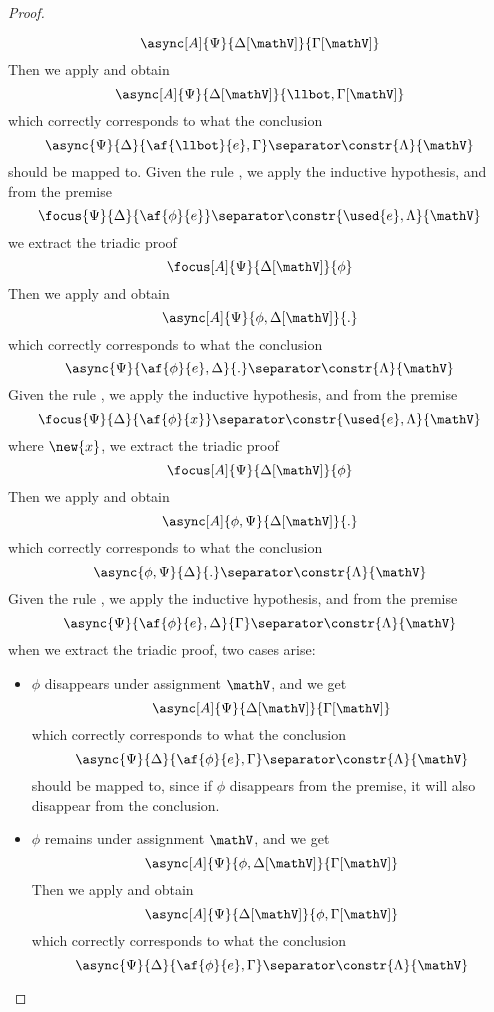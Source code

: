 \begin{proof}
\begin{itemize}
			$$ \async[A]{\Psi}{\Delta[\mathV]}{\Gamma[\mathV]} $$
			Then we apply \derRule[A]{\displaybot} and obtain
			$$ \async[A]{\Psi}{\Delta[\mathV]}{\llbot, \Gamma[\mathV]} $$
			which correctly corresponds to what the conclusion
			$$ \async{\Psi}{\Delta}{\af{\llbot}{e}, \Gamma} \separator \constr{\Lambda}{\mathV} $$
			should be mapped to.
		\indCase{\displaydecide[1]} Given the rule \derRule{\displaydecide[1]}, we apply the inductive hypothesis, and from the premise
			$$ \focus{\Psi}{\Delta}{\af{\phi}{e}} \separator \constr{\used{e}, \Lambda}{\mathV} $$
			we extract the triadic proof
			$$ \focus[A]{\Psi}{\Delta[\mathV]}{\phi} $$
			Then we apply \derRule[A]{\displaydecide[1]} and obtain
			$$ \async[A]{\Psi}{\phi, \Delta[\mathV]}{.} $$
			which correctly corresponds to what the conclusion
			$$ \async{\Psi}{\af{\phi}{e}, \Delta}{.} \separator \constr{\Lambda}{\mathV} $$
		\indCase{\displaydecide[2]} Given the rule \derRule{\displaydecide[2]}, we apply the inductive hypothesis, and from the premise
			$$ \focus{\Psi}{\Delta}{\af{\phi}{x}} \separator \constr{\used{e}, \Lambda}{\mathV} $$
			where $\new{x}$, we extract the triadic proof
			$$ \focus[A]{\Psi}{\Delta[\mathV]}{\phi} $$
			Then we apply \derRule[A]{\displaydecide[2]} and obtain
			$$ \async[A]{\phi, \Psi}{ \Delta[\mathV]}{.} $$
			which correctly corresponds to what the conclusion
			$$ \async{\phi, \Psi}{\Delta}{.} \separator \constr{\Lambda}{\mathV} $$
		\indCase{\displaytodelta} Given the rule \derRule{\displaytodelta}, we apply the inductive hypothesis, and from the premise
			$$ \async{\Psi}{\af{\phi}{e}, \Delta}{\Gamma} \separator \constr{\Lambda}{\mathV} $$
			when we extract the triadic proof, two cases arise:
			\begin{itemize}
				\item $\phi$ disappears under assignment $\mathV$, and we get
					$$ \async[A]{\Psi}{\Delta[\mathV]}{\Gamma[\mathV]} $$
					which correctly corresponds to what the conclusion
					$$ \async{\Psi}{\Delta}{\af{\phi}{e}, \Gamma} \separator \constr{\Lambda}{\mathV} $$
					should be mapped to, since if $\phi$ disappears from the premise, it will also disappear from the conclusion.
				\item $\phi$ remains under assignment $\mathV$, and we get
					$$ \async[A]{\Psi}{\phi, \Delta[\mathV]}{\Gamma[\mathV]} $$
					Then we apply \derRule[A]{\displaytodelta} and obtain
					$$ \async[A]{\Psi}{\Delta[\mathV]}{\phi, \Gamma[\mathV]} $$
					which correctly corresponds to what the conclusion
					$$ \async{\Psi}{\Delta}{\af{\phi}{e}, \Gamma} \separator \constr{\Lambda}{\mathV} $$

\end{itemize}
\end{itemize}
\end{proof}

